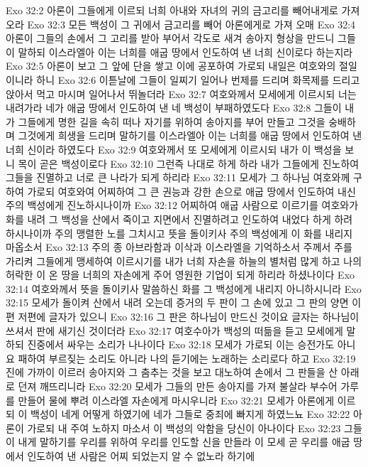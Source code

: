 Exo 32:2  아론이 그들에게 이르되 너희 아내와 자녀의 귀의 금고리를 빼어내게로 가져 오라
Exo 32:3  모든 백성이 그 귀에서 금고리를 빼어 아론에게로 가져 오매
Exo 32:4  아론이 그들의 손에서 그 고리를 받아 부어서 각도로 새겨 송아지 형상을 만드니 그들이 말하되 이스라엘아 이는 너희를 애굽 땅에서 인도하여 낸 너희 신이로다 하는지라
Exo 32:5  아론이 보고 그 앞에 단을 쌓고 이에 공포하여 가로되 내일은 여호와의 절일이니라 하니
Exo 32:6  이튿날에 그들이 일찌기 일어나 번제를 드리며 화목제를 드리고 앉아서 먹고 마시며 일어나서 뛰놀더라
Exo 32:7  여호와께서 모세에게 이르시되 너는 내려가라 네가 애굽 땅에서 인도하여 낸 네 백성이 부패하였도다
Exo 32:8  그들이 내가 그들에게 명한 길을 속히 떠나 자기를 위하여 송아지를 부어 만들고 그것을 숭배하며 그것에게 희생을 드리며 말하기를 이스라엘아 이는 너희를 애굽 땅에서 인도하여 낸 너희 신이라 하였도다
Exo 32:9  여호와께서 또 모세에게 이르시되 내가 이 백성을 보니 목이 곧은 백성이로다
Exo 32:10  그런즉 나대로 하게 하라 내가 그들에게 진노하여 그들을 진멸하고 너로 큰 나라가 되게 하리라
Exo 32:11  모세가 그 하나님 여호와께 구하여 가로되 여호와여 어찌하여 그 큰 권능과 강한 손으로 애굽 땅에서 인도하여 내신 주의 백성에게 진노하시나이까
Exo 32:12  어찌하여 애굽 사람으로 이르기를 여호와가 화를 내려 그 백성을 산에서 죽이고 지면에서 진멸하려고 인도하여 내었다 하게 하려 하시나이까 주의 맹렬한 노를 그치시고 뜻을 돌이키사 주의 백성에게 이 화를 내리지 마옵소서
Exo 32:13  주의 종 아브라함과 이삭과 이스라엘을 기억하소서 주께서 주를 가리켜 그들에게 맹세하여 이르시기를 내가 너희 자손을 하늘의 별처럼 많게 하고 나의 허락한 이 온 땅을 너희의 자손에게 주어 영원한 기업이 되게 하리라 하셨나이다
Exo 32:14  여호와께서 뜻을 돌이키사 말씀하신 화를 그 백성에게 내리지 아니하시니라
Exo 32:15  모세가 돌이켜 산에서 내려 오는데 증거의 두 판이 그 손에 있고 그 판의 양면 이편 저편에 글자가 있으니
Exo 32:16  그 판은 하나님이 만드신 것이요 글자는 하나님이 쓰셔서 판에 새기신 것이더라
Exo 32:17  여호수아가 백성의 떠듦을 듣고 모세에게 말하되 진중에서 싸우는 소리가 나나이다
Exo 32:18  모세가 가로되 이는 승전가도 아니요 패하여 부르짖는 소리도 아니라 나의 듣기에는 노래하는 소리로다 하고
Exo 32:19  진에 가까이 이르러 송아지와 그 춤추는 것을 보고 대노하여 손에서 그 판들을 산 아래로 던져 깨뜨리니라
Exo 32:20  모세가 그들의 만든 송아지를 가져 불살라 부수어 가루를 만들어 물에 뿌려 이스라엘 자손에게 마시우니라
Exo 32:21  모세가 아론에게 이르되 이 백성이 네게 어떻게 하였기에 네가 그들로 중죄에 빠지게 하였느뇨
Exo 32:22  아론이 가로되 내 주여 노하지 마소서 이 백성의 악함을 당신이 아나이다
Exo 32:23  그들이 내게 말하기를 우리를 위하여 우리를 인도할 신을 만들라 이 모세 곧 우리를 애굽 땅에서 인도하여 낸 사람은 어찌 되었는지 알 수 없노라 하기에

